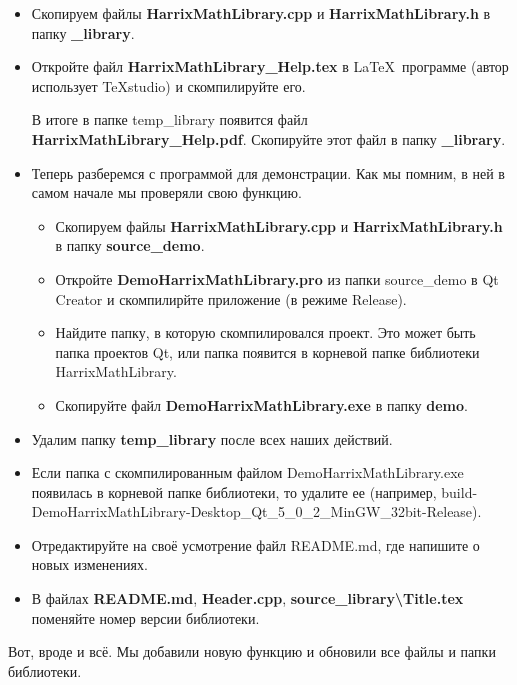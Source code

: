 \begin{itemize}
\item Скопируем файлы \textbf{HarrixMathLibrary.cpp} и \textbf{HarrixMathLibrary.h} в папку \textbf{\_library}.

\item Откройте файл \textbf{HarrixMathLibrary\_Help.tex } в \LaTeX \ программе (автор использует TeXstudio) и скомпилируйте его.

В итоге в папке temp\_library появится файл \textbf{HarrixMathLibrary\_Help.pdf}. Скопируйте этот файл в папку \textbf{\_library}.

\item Теперь разберемся с программой для демонстрации. Как мы помним, в ней в самом начале мы проверяли свою функцию. 
\begin{itemize}
\item Скопируем файлы \textbf{HarrixMathLibrary.cpp} и \textbf{HarrixMathLibrary.h} в папку \textbf{source\_demo}.
\item  Откройте \textbf{DemoHarrixMathLibrary.pro} из папки source\_demo в Qt Creator и скомпилирйте приложение (в режиме Release).
\item Найдите папку, в которую скомпилировался проект. Это может быть папка проектов Qt, или папка появится в корневой папке библиотеки HarrixMathLibrary.
\item Скопируйте файл \textbf{DemoHarrixMathLibrary.exe} в папку \textbf{demo}.
\end{itemize}
\item Удалим папку \textbf{temp\_library} после всех наших действий.
\item  Если папка с скомпилированным файлом DemoHarrixMathLibrary.exe появилась в корневой папке библиотеки, то удалите ее (например, build-DemoHarrixMathLibrary-Desktop\_Qt\_5\_0\_2\_MinGW\_32bit-Release).
\item Отредактируйте на своё усмотрение файл README.md, где напишите о новых изменениях.
\item В файлах \textbf{README.md}, \textbf{Header.cpp}, \textbf{source\_library\textbackslash Title.tex} поменяйте номер версии библиотеки.
\end{itemize}

Вот, вроде и всё. Мы добавили новую функцию и обновили все файлы и папки библиотеки.